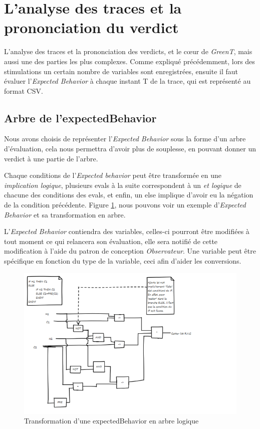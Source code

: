 \section{L'analyse des traces et la prononciation du verdict}
	L'analyse des traces et la prononciation des verdicts, et le c\oe{}ur de \textit{GreenT}, mais aussi une des parties les plus complexes. Comme expliqué précédemment, lors des stimulations un certain nombre de variables sont enregistrées, ensuite il faut évaluer l'\textit{Expected Behavior} à chaque instant T de la trace, qui est représenté au format CSV. 

	\subsection{Arbre de l'expectedBehavior}
 	Nous avons choisis de représenter l'\textit{Expected Behavior} sous la forme d'un arbre d'évaluation, cela nous permettra d'avoir plus de souplesse, en pouvant donner un verdict à une partie de l'arbre.

 	Chaque conditions de l'\textit{Expected behavior} peut être transformée en une \textit{implication logique}, plusieurs evals à la suite correspondent à un \textit{et logique} de chacune des conditions des evals, et enfin, un else implique d'avoir eu la négation de la condition précédente. Figure \ref{fig:diagLogique}, nous pouvons voir un exemple d'\textit{Expected Behavior} et sa transformation en arbre.


L'\textit{Expected Behavior} contiendra des variables, celles-ci pourront être modifiées à tout moment ce qui relancera son évaluation, elle sera notifié de cette modification à l'aide du patron de conception \textit{Observateur}. Une variable peut être spécifique en fonction du type de la variable, ceci afin d'aider les conversions.

 	\begin{figure}[H]
 		\centering
 		\includegraphics[width=18cm]{contents/images/diagLogique.png}
 		\caption{Transformation d'une expectedBehavior en arbre logique}
 		\label{fig:diagLogique}
 	\end{figure}

